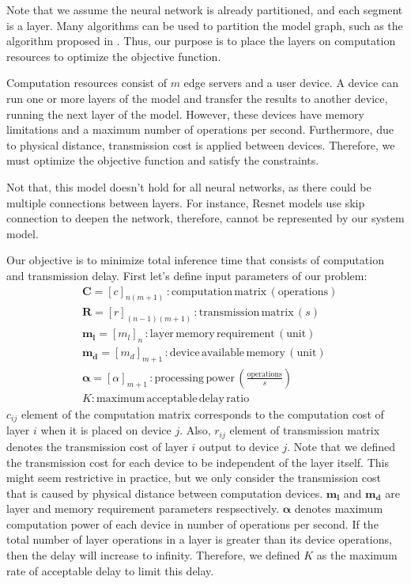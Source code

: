 \documentclass[lettersize,journal]{IEEEtran}
\begin{document}
Note that we assume the neural network is already partitioned, and each segment is a layer. Many algorithms can be used to partition the model graph, such as the algorithm proposed in \cite{9527097}. Thus, our purpose is to place the layers on computation resources to optimize the objective function.

Computation resources consist of $m$ edge servers and a user device. A device can run one or more layers of the model and transfer the results to another device, running the next layer of the model. However, these devices have memory limitations and a maximum number of operations per second. Furthermore, due to physical distance, transmission cost is applied between devices. Therefore, we must optimize the objective function and satisfy the constraints.

Not that, this model doesn't hold for all neural networks, as there could be multiple connections between layers. For instance, Resnet models use skip connection to deepen the network, therefore, cannot be represented by our system model.

Our objective is to minimize total inference time that consists of computation and transmission delay. First let's define input parameters of our problem:
\begin{align}
&\textbf{C} = [c]_{n(m+1)} \, : \mathrm{computation \, matrix} \, (\mathrm{operations}) \\
&\textbf{R} = [r]_{(n-1)(m+1)} \, : \mathrm{transmission \, matrix} \, (s) \\
&\boldsymbol{m_l} = [m_l]_{n} \, : \mathrm{layer \, memory \, requirement} \, (\mathrm{unit}) \\
&\boldsymbol{m_d} = [m_d]_{m+1} \, : \mathrm{device \, available \, memory} \, (\mathrm{unit}) \\
&\boldsymbol{\alpha} = [\alpha]_{m+1} \, : \mathrm{processing \, power} \, (\frac{\mathrm{operations}}{s}) \\
& K: \mathrm{maximum \, acceptable \, delay \, ratio} 
\end{align}
$c_{ij}$ element of the computation matrix corresponds to the computation cost of layer $i$ when it is placed on device $j$. Also, $r_{ij}$ element of transmission matrix denotes the transmission cost of layer $i$ output to device $j$. Note that we defined the transmission cost for each device to be independent of the layer itself. This might seem restrictive in practice, but we only consider the transmission cost that is caused by physical distance between computation devices. $\boldsymbol{m_l}$ and $\boldsymbol{m_d}$ are layer and memory requirement parameters respsectively. $\boldsymbol{\alpha}$ denotes maximum computation power of each device in number of operations per second. If the total number of layer operations in a layer is greater than its device operations, then the delay will increase to infinity. Therefore, we defined $K$ as the maximum rate of acceptable delay to limit this delay.
\end{document}
